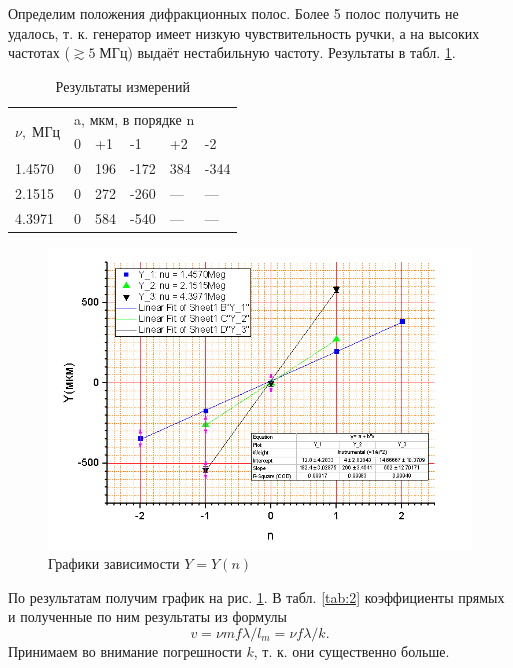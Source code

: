 \documentclass[a4paper]{article}
\begin{document}
Определим положения дифракционных полос. Более 5 полос получить не удалось, т. к. генератор имеет низкую чувствительность ручки, а на высоких частотах ($ \gtrsim 5 \; МГц $) выдаёт нестабильную частоту. Результаты в табл. \ref{tab:result}.

\begin{table}[h]
	\centering
	\begin{tabular}{|l|l|l|l|l|l|}
		\hline
		\multirow{2}{*}{$\nu, \; МГц$} & \multicolumn{5}{l|}{a, мкм, в порядке n} \\ \cline{2-6} 
		& 0    & +1     & -1      & +2    & -2     \\ \hline
		1.4570                         & 0    & 196    & -172    & 384   & -344   \\ \hline
		2.1515                         & 0    & 272    & -260    & ---   & ---    \\ \hline
		4.3971                         & 0    & 584    & -540    & ---   & ---    \\ \hline
	\end{tabular}
	\caption{Результаты измерений}
	\label{tab:result}
\end{table}

\begin{figure}[tbp]
	\centering
	\includegraphics[width=0.8\linewidth]{Screenshot_2}
	\caption{Графики зависимости $Y=Y(n)$}
	\label{fig:2}
\end{figure}


По результатам получим график на рис. \ref{fig:2}. В табл. \ref{tab:2} коэффициенты прямых и полученные по ним результаты из формулы \begin{equation}\label{eq:2}
	v =\nu m f \lambda / l_m = \nu f \lambda / k .
\end{equation} Принимаем во внимание погрешности $ k $, т. к. они существенно больше.
\end{document}
